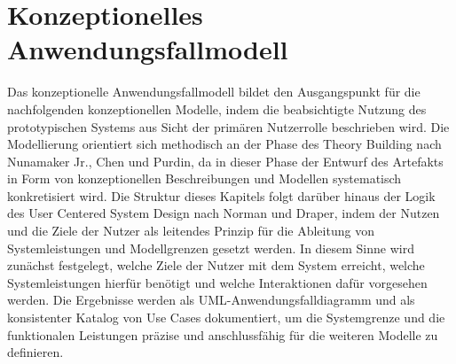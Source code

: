 \section{Konzeptionelles Anwendungsfallmodell}\label{sec:konzeptionellesAnwendungsfallmodell}
Das konzeptionelle Anwendungsfallmodell bildet den Ausgangspunkt für die nachfolgenden konzeptionellen Modelle, indem die beabsichtigte Nutzung des prototypischen Systems aus Sicht der primären Nutzerrolle beschrieben wird. \cite{jacobson2024_usecase3}
Die Modellierung orientiert sich methodisch an der Phase des Theory Building nach Nunamaker Jr., Chen und Purdin, da in dieser Phase der Entwurf des Artefakts in Form von konzeptionellen Beschreibungen und Modellen systematisch konkretisiert wird. \cite{nunamaker1990}
Die Struktur dieses Kapitels folgt darüber hinaus der Logik des User Centered System Design nach Norman und Draper, indem der Nutzen und die Ziele der Nutzer als leitendes Prinzip für die Ableitung von Systemleistungen und Modellgrenzen gesetzt werden. \cite{norman_draper1986}
In diesem Sinne wird zunächst festgelegt, welche Ziele der Nutzer mit dem System erreicht, welche Systemleistungen hierfür benötigt und welche Interaktionen dafür vorgesehen werden. \cite{norman_draper1986}
Die Ergebnisse werden als UML-Anwendungsfalldiagramm und als konsistenter Katalog von Use Cases dokumentiert, um die Systemgrenze und die funktionalen Leistungen präzise und anschlussfähig für die weiteren Modelle zu definieren. \cite{omg2017_uml251_about,jacobson2024_usecase3}


